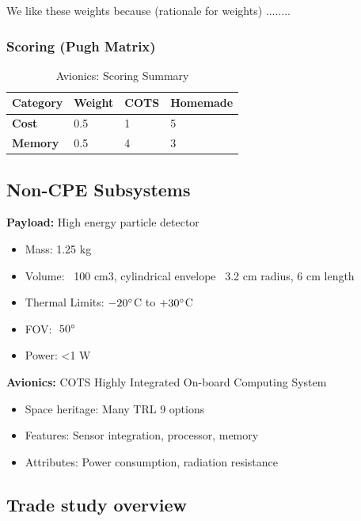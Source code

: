 \documentclass{ece}
\begin{document}
We like these weights because (rationale for weights) ........ 

\subsubsection{Scoring (Pugh Matrix)}

\begin{table}[H]
\centering
\begin{tabular}{|l|l|l|l|} 
\hline
    \textbf{Category} & \textbf{Weight} & \textbf{COTS} & \textbf{Homemade}
    \\
\hline
    \textbf{Cost} & 0.5 & 1 & 5
    \\
\hline
    \textbf{Memory} & 0.5 & 4 & 3
    \\
\hline
\end{tabular}
\caption{Avionics: Scoring Summary \cite{Boain}}
\label{tbl:avionicsscoresy}
\end{table}


\subsection{Non-CPE Subsystems}
\noindent\textbf{Payload:} High energy particle detector
\begin{itemize}
    \item Mass: 1.25 kg
    \item Volume: ~100 cm3, cylindrical envelope ~3.2 cm radius, 6 cm length
    \item Thermal Limits: $-20\degree$C to $+30\degree$C
    \item FOV: $~50\degree$
    \item Power: <1 W
\end{itemize}

\noindent\textbf{Avionics:} COTS Highly Integrated On-board Computing System
\begin{itemize}
    \item Space heritage: Many TRL 9 options
    \item Features: Sensor integration, processor, memory
    \item Attributes: Power consumption, radiation resistance
\end{itemize}


\subsection{Trade study overview}
\end{document}
